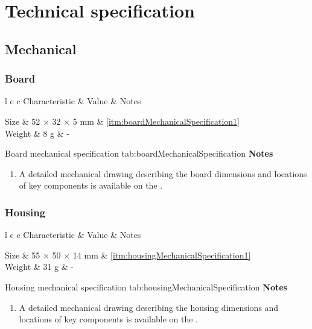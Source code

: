 \section{Technical specification}

\newcommand{\techincalTable}[5]{
    \customTable
    {l c c}
    {#1 & Value & Notes}
    {
        #2
    }
    {#3}
    {#4}
    \textbf{Notes}
    \begin{enumerate}[nolistsep]
        #5
    \end{enumerate}
}

\newcommand{\characteristicTable}[4]{
    \techincalTable
    {Characteristic}
    {#1}
    {#2}
    {#3}
    {#4}
}

\newcommand{\conditionTable}[4]{
    \techincalTable
    {Condition}
    {#1}
    {#2}
    {#3}
    {#4}
}

\subsection{Mechanical}

\subsubsection{Board}

\newcommand{\noteMechanicalDrawings}[1]{A detailed mechanical drawing describing the #1 dimensions and locations of key components is available on the \productWebPage{}.}

\characteristicTable
{
    Size & 52 $\times$ 32 $\times$ 5 mm & \ref{itm:boardMechanicalSpecification1}\\
    Weight & 8 g & -\\
}
{Board mechanical specification}
{tab:boardMechanicalSpecification}
{
    \item \label{itm:boardMechanicalSpecification1} \noteMechanicalDrawings{board}
}

\subsubsection{Housing}

\characteristicTable
{
    Size & 55 $\times$ 50 $\times$ 14 mm & \ref{itm:housingMechanicalSpecification1}\\
    Weight & 31 g & -\\
}
{Housing mechanical specification}
{tab:housingMechanicalSpecification}
{
    \item \label{itm:housingMechanicalSpecification1} \noteMechanicalDrawings{housing}
}

